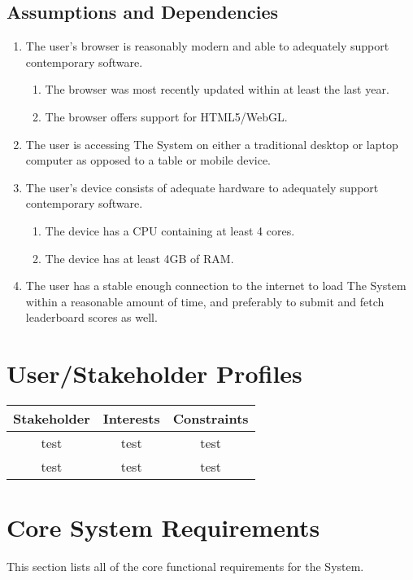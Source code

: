 \documentclass[12pt]{report}
\newenvironment{reqlist}{
	\renewcommand{\labelenumi}{\tab\thesubsection.\arabic{enumi}}
	\renewcommand{\labelenumii}{\thesubsection.\arabic{enumi}.\arabic{enumii}}
	\begin{enumerate}[itemsep = 1pt, parsep = 0pt, leftmargin = *]
}{\end{enumerate}}
\begin{document}
	\subsection{Assumptions and Dependencies}
		\begin{reqlist}
			\item The user's browser is reasonably modern and able to adequately support contemporary software.
			\begin{reqlist}
				\item The browser was most recently updated within at least the last year.
				\item The browser offers support for HTML5/WebGL.
			\end{reqlist}
			\item The user is accessing The System on either a traditional desktop or laptop computer as opposed to a table or mobile device.
			\item The user's device consists of adequate hardware to adequately support contemporary software.
			\begin{reqlist}
				\item The device has a CPU containing at least 4 cores.
				\item The device has at least 4GB of RAM.
			\end{reqlist}
			\item The user has a stable enough connection to the internet to load The System within a reasonable amount of time, and preferably to submit and fetch leaderboard scores as well.
		\end{reqlist}

\section{User/Stakeholder Profiles}
\begin{center}
	\begin{tabular}{|c|c|c|} \hline
		\textbf{Stakeholder} & \textbf{Interests} & \textbf{Constraints} \\ \hline
		test & test & test \\ \hline
		test & test & test \\ \hline
	\end{tabular}
\end{center}

\section{Core System Requirements}
	This section lists all of the core functional requirements for the System.
\end{document}
